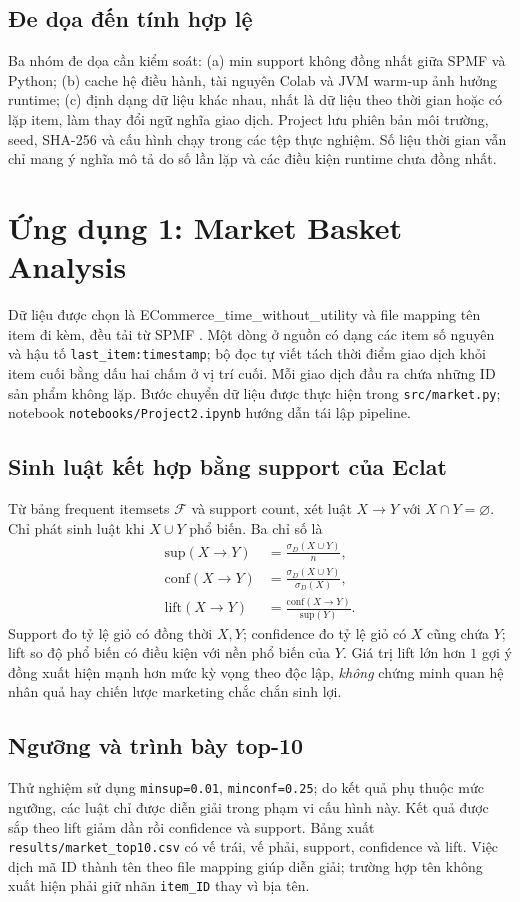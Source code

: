 \documentclass[conference,10pt]{IEEEtran}
\newcommand{\myitem}[1]{\texttt{#1}}
\begin{document}
\subsection{Đe dọa đến tính hợp lệ}
Ba nhóm đe dọa cần kiểm soát: (a) min support không đồng nhất giữa SPMF và Python; (b) cache hệ điều hành, tài nguyên Colab và JVM warm-up ảnh hưởng runtime; (c) định dạng dữ liệu khác nhau, nhất là dữ liệu theo thời gian hoặc có lặp item, làm thay đổi ngữ nghĩa giao dịch. Project lưu phiên bản môi trường, seed, SHA-256 và cấu hình chạy trong các tệp thực nghiệm. Số liệu thời gian vẫn chỉ mang ý nghĩa mô tả do số lần lặp và các điều kiện runtime chưa đồng nhất.

\section{Ứng dụng 1: Market Basket Analysis}
Dữ liệu được chọn là ECommerce\_time\_without\_utility và file mapping tên item đi kèm, đều tải từ SPMF \cite{spmfdata}. Một dòng ở nguồn có dạng các item số nguyên và hậu tố \myitem{last\_item:timestamp}; bộ đọc tự viết tách thời điểm giao dịch khỏi item cuối bằng dấu hai chấm ở vị trí cuối. Mỗi giao dịch đầu ra chứa những ID sản phẩm không lặp. Bước chuyển dữ liệu được thực hiện trong \myitem{src/market.py}; notebook \myitem{notebooks/Project2.ipynb} hướng dẫn tái lập pipeline.

\subsection{Sinh luật kết hợp bằng support của Eclat}
Từ bảng frequent itemsets $\mathcal F$ và support count, xét luật $X\to Y$ với $X\cap Y=\varnothing$. Chỉ phát sinh luật khi $X\cup Y$ phổ biến. Ba chỉ số là
\begin{align}
\mathrm{sup}(X\to Y)&=\frac{\sigma_D(X\cup Y)}{n},\\
\mathrm{conf}(X\to Y)&=\frac{\sigma_D(X\cup Y)}{\sigma_D(X)},\\
\mathrm{lift}(X\to Y)&=\frac{\mathrm{conf}(X\to Y)}{\mathrm{sup}(Y)}.
\end{align}
Support đo tỷ lệ giỏ có đồng thời $X,Y$; confidence đo tỷ lệ giỏ có $X$ cũng chứa $Y$; lift so độ phổ biến có điều kiện với nền phổ biến của $Y$. Giá trị lift lớn hơn $1$ gợi ý đồng xuất hiện mạnh hơn mức kỳ vọng theo độc lập, \emph{không} chứng minh quan hệ nhân quả hay chiến lược marketing chắc chắn sinh lợi.

\subsection{Ngưỡng và trình bày top-10}
Thử nghiệm sử dụng \myitem{minsup=0.01}, \myitem{minconf=0.25}; do kết quả phụ thuộc mức ngưỡng, các luật chỉ được diễn giải trong phạm vi cấu hình này. Kết quả được sắp theo lift giảm dần rồi confidence và support. Bảng xuất \myitem{results/market\_top10.csv} có vế trái, vế phải, support, confidence và lift. Việc dịch mã ID thành tên theo file mapping giúp diễn giải; trường hợp tên không xuất hiện phải giữ nhãn \myitem{item\_ID} thay vì bịa tên.
\end{document}
